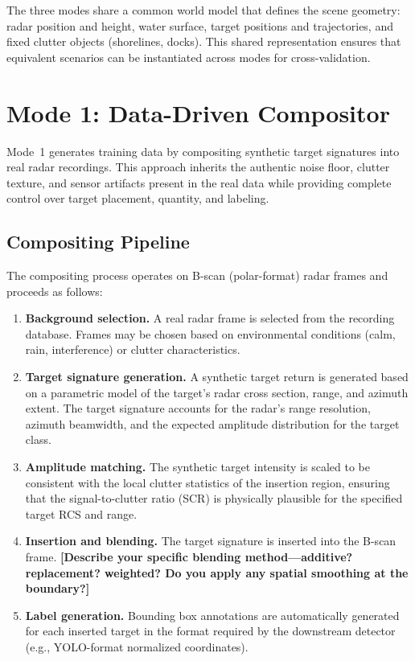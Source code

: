 \documentclass[conf]{new-aiaa}
\newcommand{\ph}[1]{\textbf{[#1]}}
\begin{document}
The three modes share a common world model that defines the scene geometry: radar position and height, water surface, target positions and trajectories, and fixed clutter objects (shorelines, docks). This shared representation ensures that equivalent scenarios can be instantiated across modes for cross-validation.

\section{Mode 1: Data-Driven Compositor}
\label{sec:mode1}

Mode~1 generates training data by compositing synthetic target signatures into real radar recordings. This approach inherits the authentic noise floor, clutter texture, and sensor artifacts present in the real data while providing complete control over target placement, quantity, and labeling.

\subsection{Compositing Pipeline}

The compositing process operates on B-scan (polar-format) radar frames and proceeds as follows:

\begin{enumerate}
    \item \textbf{Background selection.} A real radar frame is selected from the recording database. Frames may be chosen based on environmental conditions (calm, rain, interference) or clutter characteristics.
    \item \textbf{Target signature generation.} A synthetic target return is generated based on a parametric model of the target's radar cross section, range, and azimuth extent. The target signature accounts for the radar's range resolution, azimuth beamwidth, and the expected amplitude distribution for the target class.
    \item \textbf{Amplitude matching.} The synthetic target intensity is scaled to be consistent with the local clutter statistics of the insertion region, ensuring that the signal-to-clutter ratio (SCR) is physically plausible for the specified target RCS and range.
    \item \textbf{Insertion and blending.} The target signature is inserted into the B-scan frame. \ph{Describe your specific blending method---additive? replacement? weighted? Do you apply any spatial smoothing at the boundary?}
    \item \textbf{Label generation.} Bounding box annotations are automatically generated for each inserted target in the format required by the downstream detector (e.g., YOLO-format normalized coordinates).
\end{enumerate}
\end{document}

